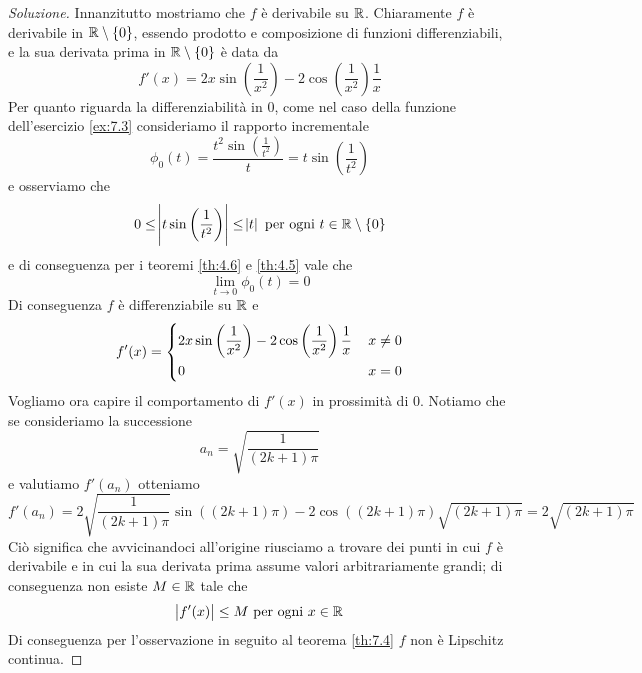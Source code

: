 \begin{proof}[Soluzione]
    Innanzitutto mostriamo che $f$ è derivabile su $\amsbb{R}$. Chiaramente $f$ è derivabile in $\amsbb{R}\setminus\{0\}$, essendo prodotto e composizione di funzioni differenziabili, e la sua derivata prima in $\amsbb{R}\setminus\{0\}$ è data da
    \[
    f'(x) = 2x\sin\left(\frac{1}{x^2}\right)-2\cos\left(\frac{1}{x^2}\right)\frac{1}{x}
    \]
    Per quanto riguarda la differenziabilità in $0$, come nel caso della funzione dell'esercizio \ref{ex:7.3} consideriamo il rapporto incrementale
    \[
    \phi_0(t) = \frac{t^2\sin\left(\frac{1}{t^2}\right)}{t} = t\sin\left(\frac{1}{t^2}\right)
    \]
    e osserviamo che
    \[
    0\le \abs{t\sin\left(\frac{1}{t^2}\right)}\le \abs{t}  \ \text{per ogni}\ t\in\amsbb{R}\setminus\{0\}
    \]
    e di conseguenza per i teoremi \ref{th:4.6} e \ref{th:4.5} vale che
    \[
    \lim_{t\to 0} \phi_0(t) = 0
    \]
    Di conseguenza $f$ è differenziabile su $\amsbb{R}$ e
    \[
    f'(x) = \begin{dcases}
        2x\sin\left(\frac{1}{x^2}\right)-2\cos\left(\frac{1}{x^2}\right)\frac{1}{x}\, & x\ne 0\\
        0\, & x=0
    \end{dcases}
    \]
    Vogliamo ora capire il comportamento di $f'(x)$ in prossimità di $0$. Notiamo che se consideriamo la successione
    \[
    a_n = \sqrt{\frac{1}{(2k+1)\pi}}
    \]
    e valutiamo $f'(a_n)$ otteniamo
    \[
    f'(a_n) = 2\sqrt{\frac{1}{(2k+1)\pi}}\sin((2k+1)\pi)-2\cos((2k+1)\pi)\sqrt{(2k+1)\pi} = 2\sqrt{(2k+1)\pi}
    \]
    Ciò significa che avvicinandoci all'origine riusciamo a trovare dei punti in cui $f$ è derivabile e in cui la sua derivata prima assume valori arbitrariamente grandi; di conseguenza non esiste $M\in\amsbb{R}$ tale che
    \[
    \abs{f'(x)}\le M \ \text{per ogni} \ x\in\amsbb{R}
    \]
    Di conseguenza per l'osservazione in seguito al teorema \ref{th:7.4} $f$ non è Lipschitz continua.
\end{proof}
